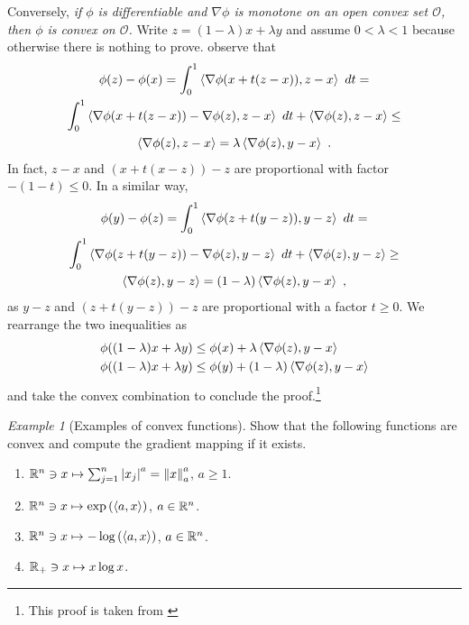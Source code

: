 \documentclass[12pt,a4paper]{amsart}
\theoremstyle{plain}%
\theoremstyle{definition}
\theoremstyle{remark}
\newtheorem{example}{Example}
\begin{document}
Conversely, \emph{if $\phi$ is differentiable and $\nabla \phi$ is monotone on an open convex set $\mathcal O$, then $\phi$ is convex on $\mathcal O$.} Write $z = (1-\lambda)x + \lambda y$ and assume $0 < \lambda < 1$ because otherwise there is nothing to prove. observe that
\begin{multline*}
  \phi(z) - \phi(x) = \int_0^1 \scalarof {\nabla\phi(x + t (z-x))}{z-x} \ dt = \\
  \int_0^1 \scalarof {\nabla\phi(x + t (z-x)) - \nabla\phi(z)}{z-x} \ dt + \scalarof{\nabla\phi(z)}{z-x} \leq \\ \scalarof{\nabla\phi(z)}{z-x} = \lambda \scalarof{\nabla\phi(z)}{y-x} \ .
\end{multline*}
In fact, $z-x$ and $(x + t(x-z)) - z$ are proportional with factor $-(1-t) \leq 0$. In a similar way,
\begin{multline*}
  \phi(y) - \phi(z) = \int_0^1 \scalarof {\nabla\phi(z + t  (y-z))}{y-z} \ dt = \\
  \int_0^1 \scalarof {\nabla\phi(z + t (y-z))-\nabla\phi(z)}{y-z} \ dt + \scalarof{\nabla\phi(z)}{y-z} \geq \\ \scalarof{\nabla\phi(z)}{y-z} = (1-\lambda) \scalarof{\nabla\phi(z)}{y-x}\ ,
\end{multline*}
as $y-z$ and $(z+t(y-z)) - z$ are proportional with a factor $t \geq 0$. We rearrange the two inequalities as
\begin{align*}
  \phi((1-\lambda)x+\lambda y) &\leq \phi(x) + \lambda \scalarof{\nabla\phi(z)}{y-x} \\
  \phi((1-\lambda)x+\lambda y) &\leq \phi(y) + (1-\lambda) \scalarof{\nabla\phi(z)}{y-x} 
\end{align*}
and take the convex combination to conclude the proof.\footnote{This proof is taken from \cite[p. 26]{rockafellar:1970}}

\begin{example}[Examples of convex functions]
Show that the following functions are convex and compute the gradient mapping if it exists.
\begin{enumerate}
\item $\reals^n \ni x \mapsto \sum_{j=1}^n \aval{x_j}^a = \normat a x ^ a$, $a \geq 1$.
\item $\reals^n \ni x \mapsto \expof{\scalarof a x}$, $a \in \reals^n$.
\item $\reals^n \ni x \mapsto -\logof{\scalarof a x}$, $a \in \reals^n$.
\item $\reals_+ \ni x \mapsto x\log x$.
\end{enumerate}
\end{example}
\end{document}
